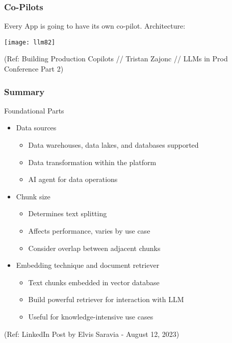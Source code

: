\begin{frame}[fragile]\frametitle{Co-Pilots}

Every App is going to have its own co-pilot. Architecture:

\begin{center}
\texttt{[image: llm82]}
\end{center}

{\tiny (Ref: Building Production Copilots // Tristan Zajonc // LLMs in Prod Conference Part 2)}
\end{frame}


\begin{frame}[fragile]\frametitle{Summary}

Foundational Parts
\begin{itemize}
    \item Data sources
    \begin{itemize}
        \item Data warehouses, data lakes, and databases supported
        \item Data transformation within the platform
        \item AI agent for data operations
    \end{itemize}
    \item Chunk size
    \begin{itemize}
        \item Determines text splitting
        \item Affects performance, varies by use case
        \item Consider overlap between adjacent chunks
    \end{itemize}
    \item Embedding technique and document retriever
    \begin{itemize}
        \item Text chunks embedded in vector database
        \item Build powerful retriever for interaction with LLM
        \item Useful for knowledge-intensive use cases
    \end{itemize}
\end{itemize}

{\tiny (Ref: LinkedIn Post by Elvis Saravia -  August 12, 2023)}

\end{frame}

